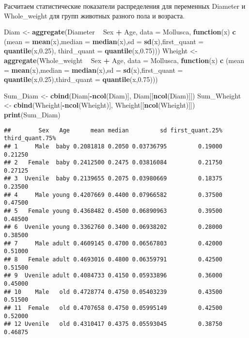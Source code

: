 \documentclass[]{article}
\newenvironment{Shaded}{\begin{snugshade}}{\end{snugshade}}
\newcommand{\ControlFlowTok}[1]{\textcolor[rgb]{0.13,0.29,0.53}{\textbf{#1}}}
\newcommand{\DataTypeTok}[1]{\textcolor[rgb]{0.13,0.29,0.53}{#1}}
\newcommand{\FloatTok}[1]{\textcolor[rgb]{0.00,0.00,0.81}{#1}}
\newcommand{\KeywordTok}[1]{\textcolor[rgb]{0.13,0.29,0.53}{\textbf{#1}}}
\newcommand{\NormalTok}[1]{#1}
\newcommand{\OperatorTok}[1]{\textcolor[rgb]{0.81,0.36,0.00}{\textbf{#1}}}
\newcommand{\StringTok}[1]{\textcolor[rgb]{0.31,0.60,0.02}{#1}}
\begin{document}
Расчитаем статистические показатели распределения для переменных
Diameter и Whole\_weight для групп животных разного пола и возраста.

\begin{Shaded}
\begin{Highlighting}[]
\NormalTok{Diam <-}\StringTok{ }\KeywordTok{aggregate}\NormalTok{(Diameter }\OperatorTok{~}\StringTok{ }\NormalTok{Sex }\OperatorTok{+}\StringTok{ }\NormalTok{Age, }\DataTypeTok{data =}\NormalTok{ Mollusca, }\ControlFlowTok{function}\NormalTok{(x) }\KeywordTok{c}\NormalTok{ (}\DataTypeTok{mean =} \KeywordTok{mean}\NormalTok{(x),}\DataTypeTok{median =} \KeywordTok{median}\NormalTok{(x),}\DataTypeTok{sd =} \KeywordTok{sd}\NormalTok{(x),}\DataTypeTok{first_quant =} \KeywordTok{quantile}\NormalTok{(x,}\FloatTok{0.25}\NormalTok{), }\DataTypeTok{third_quant =} \KeywordTok{quantile}\NormalTok{(x,}\FloatTok{0.75}\NormalTok{)))}
\NormalTok{Wheight <-}\StringTok{ }\KeywordTok{aggregate}\NormalTok{(Whole_weight }\OperatorTok{~}\StringTok{ }\NormalTok{Sex }\OperatorTok{+}\StringTok{ }\NormalTok{Age, }\DataTypeTok{data =}\NormalTok{ Mollusca, }\ControlFlowTok{function}\NormalTok{(x) }\KeywordTok{c}\NormalTok{ (}\DataTypeTok{mean =} \KeywordTok{mean}\NormalTok{(x),}\DataTypeTok{median =} \KeywordTok{median}\NormalTok{(x),}\DataTypeTok{sd =} \KeywordTok{sd}\NormalTok{(x),}\DataTypeTok{first_quant =} \KeywordTok{quantile}\NormalTok{(x,}\FloatTok{0.25}\NormalTok{),}\DataTypeTok{third_quant =} \KeywordTok{quantile}\NormalTok{(x,}\FloatTok{0.75}\NormalTok{)))}

\NormalTok{Sum_Diam <-}\StringTok{ }\KeywordTok{cbind}\NormalTok{(Diam[}\OperatorTok{-}\KeywordTok{ncol}\NormalTok{(Diam)], Diam[[}\KeywordTok{ncol}\NormalTok{(Diam)]])}
\NormalTok{Sum_Wheight <-}\StringTok{ }\KeywordTok{cbind}\NormalTok{(Wheight[}\OperatorTok{-}\KeywordTok{ncol}\NormalTok{(Wheight)], Wheight[[}\KeywordTok{ncol}\NormalTok{(Wheight)]])}
\KeywordTok{print}\NormalTok{(Sum_Diam)}
\end{Highlighting}
\end{Shaded}

\begin{verbatim}
##        Sex   Age      mean median         sd first_quant.25% third_quant.75%
## 1     Male  baby 0.2081818 0.2050 0.03736795         0.19000         0.21250
## 2   Female  baby 0.2412500 0.2475 0.03816084         0.21750         0.27125
## 3  Uvenile  baby 0.2139655 0.2075 0.03980669         0.18375         0.23500
## 4     Male young 0.4207669 0.4400 0.07966582         0.37500         0.47500
## 5   Female young 0.4368482 0.4500 0.06890963         0.39500         0.48500
## 6  Uvenile young 0.3362760 0.3400 0.06938202         0.28000         0.38500
## 7     Male adult 0.4609145 0.4700 0.06567803         0.42000         0.51000
## 8   Female adult 0.4693016 0.4800 0.06359791         0.42500         0.51500
## 9  Uvenile adult 0.4084733 0.4150 0.05933896         0.36000         0.45000
## 10    Male   old 0.4728774 0.4750 0.05403239         0.43500         0.51500
## 11  Female   old 0.4707658 0.4750 0.05995149         0.42500         0.52000
## 12 Uvenile   old 0.4310417 0.4375 0.05593045         0.38750         0.46875
\end{verbatim}
\end{document}
